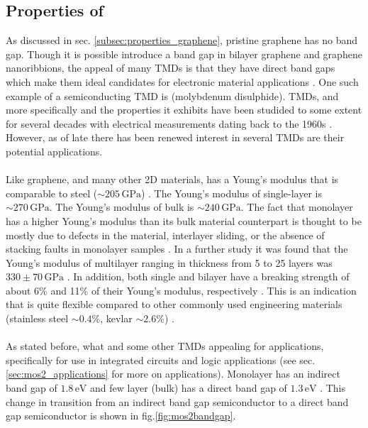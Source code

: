 \documentclass[%
 reprint,
 amsmath,amssymb,
 aps,
pra,
floatfix,
]{revtex4-1}
\begin{document}
\subsection{\label{subsec:mos2_properties} Properties of }
As discussed in sec. \ref{subsec:properties_graphene}, pristine graphene has no band gap. Though it is possible introduce a band gap in bilayer graphene and graphene nanoribbions, the appeal of many TMDs is that they have direct band gaps which make them ideal candidates for electronic material applications \cite{grapheneLike2Dreview2013}. One such example of a semiconducting TMD is  (molybdenum disulphide). TMDs, and more specifically  and the properties it exhibits have been studided to some extent for several decades with electrical measurements dating back to the 1960s \cite{Frindt1963, Fivaz1967}. However, as of late there has been renewed interest in several TMDs are their potential applications. 
\\ \\
Like graphene, and many other 2D materials,  has a Young's modulus that is comparable to steel ($\sim 205 \mathrm{\,GPa}$) \cite{Warlimont2009}. The Young's modulus of single-layer  is $\sim 270 \mathrm{\,GPa}$. The Young's modulus of bulk  is $\sim 240 \mathrm{\,GPa}$. The fact that monolayer  has a higher Young's modulus than its bulk material counterpart is thought to be mostly due to defects in the material, interlayer sliding, or the absence of stacking faults in monolayer samples \cite{Lembke2015}. In a further study it was found that the Young's modulus of multilayer  ranging in thickness from 5 to 25 layers was $330 \pm 70 \mathrm{\,GPa}$ \cite{Castellanos2012}. In addition, both single and bilayer  have a breaking strength of about 6\% and 11\% of their Young's modulus, respectively \cite{Bertolazzi2011}. This is an indication that  is quite flexible compared to other commonly used engineering materials (stainless steel $\sim 0.4\%$, kevlar $\sim 2.6\%$) \cite{Gere1997}. 
\\ \\
As stated before, what  and some other TMDs appealing for applications, specifically for use in integrated circuits and logic applications (see sec.\ref{sec:mos2_applications} for more on applications). Monolayer  has an indirect band gap of $1.8 \mathrm{\,eV}$ and few layer (bulk)  has a direct band gap of $1.3 \mathrm{\,eV}$ \cite{grapheneLike2Dreview2013, Kam1982, Mak2010, Gourmelon1997, Fortin1982}. This change in transition from an indirect band gap semiconductor to a direct band gap semiconductor is shown in fig.\ref{fig:mos2bandgap}.
\end{document}
